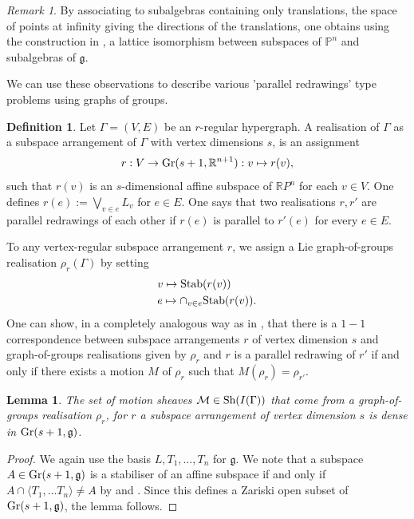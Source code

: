 \documentclass{article}
\newtheorem{lemma}[theorem]{Lemma}
\theoremstyle{definition}
\newtheorem{definition}[theorem]{Definition}
\theoremstyle{remark}
\newtheorem{remark}[theorem]{Remark}
\begin{document}
\begin{remark}
    By associating to subalgebras containing only translations, the space of points at infinity giving the directions of the translations, one obtains using the construction in , a lattice isomorphism between subspaces of $\mathbb{P}^{n}$ and subalgebras of $\mathfrak{g}$. 
\end{remark}

We can use these observations to describe various 'parallel redrawings' type problems using graphs of groups.

\begin{definition}
    Let $\Gamma=(V,E)$ be an $r$-regular hypergraph. A realisation of $\Gamma$ as a subspace arrangement of $\Gamma$ with vertex dimensions $s$, is an assignment $$r: V \rightarrow \textup{Gr}(s + 1, \mathbb{R}^{n+1}): v\mapsto r(v),$$ such that $r(v)$ is an $s$-dimensional affine subspace of $\mathbb{R}P^{n}$ for each $v\in V$. One defines $r(e) := \bigvee_{v\in e} L_v$ for $e\in E$. One says that two realisations $r, r'$ are parallel redrawings of each other if $r(e)$ is parallel to $r'(e)$ for every $e\in E$.
\end{definition}

To any vertex-regular subspace arrangement $r$, we assign a Lie graph-of-groups realisation $\rho_{r}(\Gamma)$ by setting
\begin{align*}
    &v\mapsto \textup{Stab}(r(v))\\    
    &e \mapsto \cap_{v\in e}\textup{Stab}(r(v)).
\end{align*}
One can show, in a completely analogous way as in \cite[Theorem 4.3]{graphsofgroups}, that there is a $1-1$ correspondence between subspace arrangements $r$ of vertex dimension $s$ and graph-of-groups realisations given by $\rho_r$ and $r$ is a parallel redrawing of $r'$ if and only if there exists a motion $M$ of $\rho_r$ such that $M(\rho_r) = \rho_{r'}$.

\begin{lemma}\label{lem : Parallel lemma}
    The set of motion sheaves $\mathcal{M} \in \textup{Sh}(I(\Gamma))$ that come from a graph-of-groups realisation $\rho_{r}$, for $r$ a subspace arrangement of vertex dimension $s$ is dense in $\textup{Gr}(s +1, \mathfrak{g})$. 
\end{lemma}
\begin{proof}
    We again use the basis $L, T_1, \dots, T_n$ for $\mathfrak{g}$. We note that a subspace $A\in \textup{Gr}(s+1, \mathfrak{g})$ is a stabiliser of an affine subspace if and only if $A \cap \langle T_1, \dots T_n\rangle \neq A$ by  and . Since this defines a Zariski open subset of  $\textup{Gr}(s+1, \mathfrak{g})$, the lemma follows. 
\end{proof}
\end{document}
